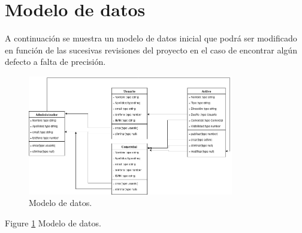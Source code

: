 \section{Modelo de datos}
\par A continuación se muestra un modelo de datos inicial que podrá ser modificado en función de las sucesivas revisiones del proyecto en el caso de encontrar algún defecto a falta de precisión.

\begin{figure}
  \centering
    \includegraphics[width=0.8\textwidth]{img/datamodel.jpeg}
  \caption{Modelo de datos.}
  \label{fig:datamodel}
\end{figure}
Figure \ref{fig:datamodel} Modelo de datos.
